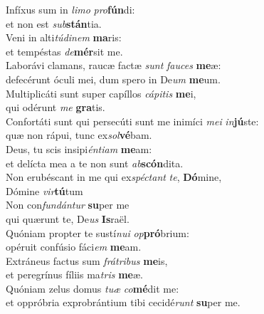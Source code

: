 \evenverse Infíxus sum in \textit{li}\textit{mo} \textit{pro}\textbf{fún}di:~\*\\
\evenverse et non est \textit{sub}\textbf{stán}tia.\\
\oddverse Veni in alti\textit{tú}\textit{di}\textit{nem} \textbf{ma}ris:~\*\\
\oddverse et tempéstas \textit{de}\textbf{mér}sit me.\\
\evenverse Laborávi clamans, raucæ factæ \textit{sunt} \textit{fau}\textit{ces} \textbf{me}æ:~\*\\
\evenverse defecérunt óculi mei, dum spero in De\textit{um} \textbf{me}um.\\
\oddverse Multiplicáti sunt super capíllos \textit{cá}\textit{pi}\textit{tis} \textbf{me}i,~\*\\
\oddverse qui odérunt \textit{me} \textbf{gra}tis.\\
\evenverse Confortáti sunt qui persecúti sunt me inimíci \textit{me}\textit{i} \textit{in}\textbf{jú}ste:~\*\\
\evenverse quæ non rápui, tunc ex\textit{sol}\textbf{vé}bam.\\
\oddverse Deus, tu scis insipi\textit{én}\textit{ti}\textit{am} \textbf{me}am:~\*\\
\oddverse et delícta mea a te non sunt \textit{ab}\textbf{scón}dita.\\
\evenverse Non erubéscant in me qui ex\textit{spé}\textit{ctant} \textit{te}, \textbf{Dó}mine,~\*\\
\evenverse Dómine \textit{vir}\textbf{tú}tum\\
\oddverse Non con\textit{fun}\textit{dán}\textit{tur} \textbf{su}per me~\*\\
\oddverse qui quærunt te, De\textit{us} \textbf{Is}raël.\\
\evenverse Quóniam propter te sustí\textit{nu}\textit{i} \textit{op}\textbf{pró}brium:~\*\\
\evenverse opéruit confúsio fáci\textit{em} \textbf{me}am.\\
\oddverse Extráneus factus sum \textit{frá}\textit{tri}\textit{bus} \textbf{me}is,~\*\\
\oddverse et peregrínus fíliis ma\textit{tris} \textbf{me}æ.\\
\evenverse Quóniam zelus domus \textit{tu}\textit{æ} \textit{co}\textbf{mé}dit me:~\*\\
\evenverse et oppróbria exprobrántium tibi cecidé\textit{runt} \textbf{su}per me.\\
